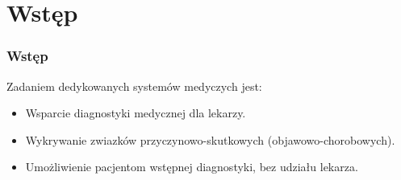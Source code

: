 \section{Wstęp}

\begin{frame}
\frametitle{Wstęp}

Zadaniem dedykowanych systemów medyczych jest:
\begin{itemize}
 \item Wsparcie diagnostyki medycznej dla lekarzy.
 \item Wykrywanie zwiazków przyczynowo-skutkowych (objawowo-chorobowych).
 \item Umożliwienie pacjentom wstępnej diagnostyki, bez udziału lekarza.
\end{itemize}

\end{frame}

